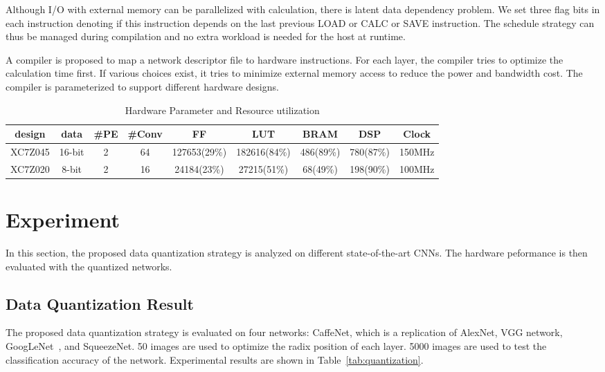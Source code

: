 \documentclass[10pt, conference, compsocconf]{IEEEtran}
\begin{document}
Although I/O with external memory can be parallelized with calculation, there is latent data dependency problem. We set three flag bits in each instruction denoting if this instruction depends on the last previous LOAD or CALC or SAVE instruction. The schedule strategy can thus be managed during compilation and no extra workload is needed for the host at runtime.

A compiler is proposed to map a network descriptor file to hardware instructions. For each layer, the compiler tries to optimize the calculation time first. If various choices exist, it tries to minimize external memory access to reduce the power and bandwidth cost. The compiler is parameterized to support different hardware designs.

\begin{table}[t]
    \centering
    \caption{Hardware Parameter and Resource utilization}
    \label{tab:resource}
    \scriptsize
    \begin{tabular}{|c|c|c|c|c|c|c|c|c|} \hline
        design & data & \#PE & \#Conv & FF & LUT & BRAM & DSP & Clock\\ \hline
        XC7Z045 & 16-bit & 2 & 64 & 127653(29\%) & 182616(84\%) & 486(89\%) & 780(87\%) & 150MHz\\ \hline
        XC7Z020 & 8-bit & 2 & 16 & 24184(23\%) & 27215(51\%) & 68(49\%) & 198(90\%) & 100MHz \\ \hline
    \end{tabular}
\end{table}

\section{Experiment}\label{sec:experiment}
In this section, the proposed data quantization strategy is analyzed on different state-of-the-art CNNs. The hardware peformance is then evaluated with the quantized networks.

\subsection{Data Quantization Result}
The proposed data quantization strategy is evaluated on four networks: CaffeNet, which is a replication of AlexNet, VGG network, GoogLeNet~\cite{szegedy2014going}, and SqueezeNet.
50 images are used to optimize the radix position of each layer. 5000 images are used to test the classification accuracy of the network. Experimental results are shown in Table~\ref{tab:quantization}.
\end{document}
